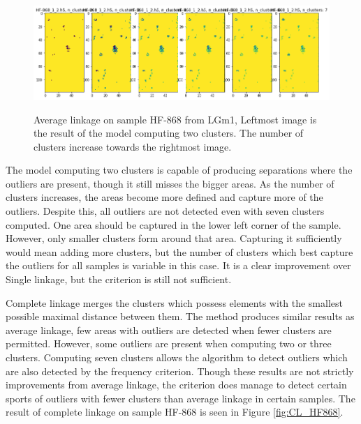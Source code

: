 \begin{figure}[H]

    \centering
{\includegraphics[width=15cm]{images/Average_linkage/LGm-1/HF-868_1_2.h5_0.png} }
\caption{Average linkage on sample HF-868 from LGm1, Leftmost image is the result of the model computing two clusters. The number of clusters increase towards the rightmost image.\label{fig:AL_HF868}}%

\end{figure}

The model computing two clusters is capable of producing separations where the outliers are present, though it still misses the bigger areas. As the number of clusters increases, the areas become more defined and capture more of the outliers. Despite this, all outliers are not detected even with seven clusters computed. One area should be captured in the lower left corner of the sample. However, only smaller clusters form around that area. Capturing it sufficiently would mean adding more clusters, but the number of clusters which best capture the outliers for all samples is variable in this case. It is a clear improvement over Single linkage, but the criterion is still not sufficient.

Complete linkage merges the clusters which possess elements with the smallest possible maximal distance between them. The method produces similar results as average linkage, few areas with outliers are detected when fewer clusters are permitted. However, some outliers are present when computing two or three clusters. Computing seven clusters allows the algorithm to detect outliers which are also detected by the frequency criterion. Though these results are not strictly improvements from average linkage, the criterion does manage to detect certain sports of outliers with fewer clusters than average linkage in certain samples. The result of complete linkage on sample HF-868 is seen in Figure \ref{fig:CL_HF868}.

